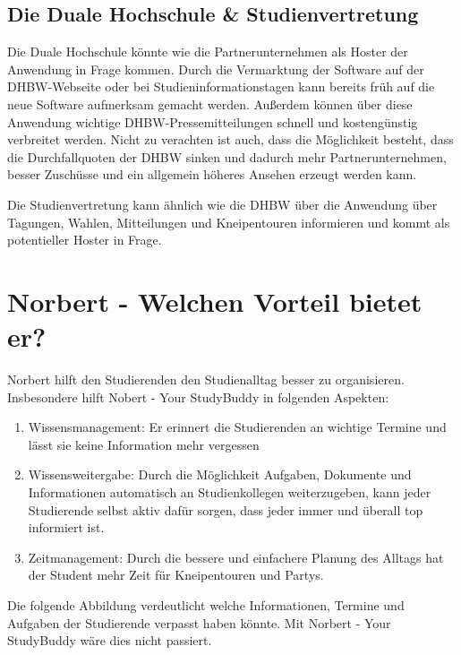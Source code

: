 \subsection{Die Duale Hochschule \& Studienvertretung}
Die Duale Hochschule könnte wie die Partnerunternehmen als Hoster der Anwendung in Frage kommen. Durch die Vermarktung der Software auf der DHBW-Webseite oder bei Studieninformationstagen kann bereits früh auf die neue Software aufmerksam gemacht werden. Außerdem können über diese Anwendung wichtige DHBW-Pressemitteilungen schnell und kostengünstig verbreitet werden. Nicht zu verachten ist auch, dass die Möglichkeit besteht, dass die Durchfallquoten der DHBW sinken und dadurch mehr Partnerunternehmen, besser Zuschüsse und ein allgemein höheres Ansehen erzeugt werden kann.

Die Studienvertretung kann ähnlich wie die DHBW über die Anwendung über Tagungen, Wahlen, Mitteilungen und Kneipentouren informieren und kommt als potentieller Hoster in Frage.

\section{Norbert - Welchen Vorteil bietet er?}
Norbert hilft den Studierenden den Studienalltag besser zu organisieren. Insbesondere hilft Nobert - Your StudyBuddy in folgenden Aspekten:
\begin{enumerate}
	\item Wissensmanagement: Er erinnert die Studierenden an wichtige Termine und lässt sie keine Information mehr vergessen
	\item Wissensweitergabe: Durch die Möglichkeit Aufgaben, Dokumente und Informationen automatisch an Studienkollegen weiterzugeben, kann jeder Studierende selbst aktiv dafür sorgen, dass jeder immer und überall top informiert ist.
	\item Zeitmanagement: Durch die bessere und einfachere Planung des Alltags hat der Student mehr Zeit für Kneipentouren und Partys.	
\end{enumerate}

Die folgende Abbildung verdeutlicht welche Informationen, Termine und Aufgaben der Studierende verpasst haben könnte. Mit Norbert - Your StudyBuddy wäre dies nicht passiert.

